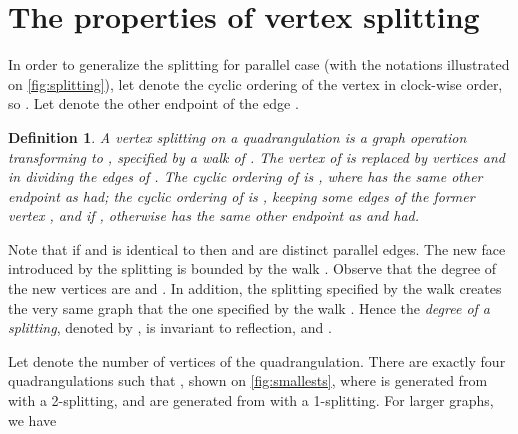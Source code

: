 \documentclass[]{article}
\newtheorem{defn}{Definition}
\begin{document}
\section{The properties of vertex splitting} \label{sec:splitting}



In order to generalize the splitting for parallel case (with the notations illustrated on \autoref{fig:splitting}), 
let  denote the cyclic ordering of the vertex  in clock-wise order, so . Let  denote the other endpoint of the edge .
\begin{defn}
A \emph{vertex splitting} on a quadrangulation  is a graph operation transforming  to , specified by a walk  of .
The vertex  of  is replaced by vertices  and  in  dividing the edges of .
The cyclic ordering of  is , where  has the same other endpoint as  had;
the cyclic ordering of  is , keeping some edges of the former vertex , and  if , otherwise  has the same other endpoint as  and  had.
\end{defn}

Note that if  and  is identical to  then  and  are distinct parallel edges.
The new face introduced by the splitting is bounded by the walk .
Observe that the degree of the new vertices are  and .
In addition, the splitting specified by the walk  creates the very same graph that the one specified by the walk .
Hence the \emph{degree of a splitting}, denoted by , is invariant to reflection, and .

Let  denote the number of vertices of the quadrangulation.
There are exactly four quadrangulations such that , shown on \autoref{fig:smallests}, where  is generated from  with a 2-splitting, and  are generated from  with a 1-splitting.
For larger graphs, we have
\end{document}
